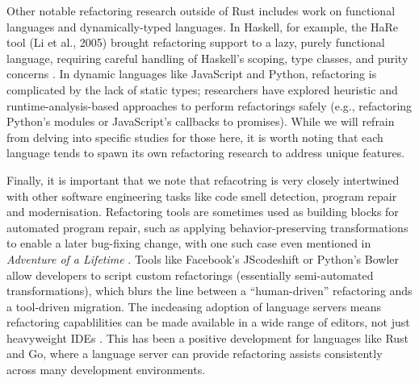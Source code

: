 Other notable refactoring research outside of Rust includes work on functional
languages and dynamically-typed languages. In Haskell, for example, the HaRe
tool (Li et al., 2005) brought refactoring support to a lazy, purely functional
language, requiring careful handling of Haskell's scoping, type classes, and
purity concerns \cite{HaRe}. In dynamic languages like JavaScript and Python, refactoring is
complicated by the lack of static types; researchers have explored heuristic and
runtime-analysis-based approaches to perform refactorings safely (e.g.,
refactoring Python's modules or JavaScript's callbacks to promises). While we
will refrain from delving into specific studies for those here, it is worth noting that each
language tends to spawn its own refactoring research to address unique features.

Finally, it is important that we note that refacotring is very closely
intertwined with other software engineering tasks like code smell detection,
program repair and modernisation. Refactoring tools are sometimes used as
building blocks for automated program repair, such as applying
behavior-preserving transformations to enable a later bug-fixing change, with
one such case even mentioned in
\textit{Adventure of a Lifetime} \cite{AdventureOfALifetime}. Tools like
Facebook's JScodeshift or Python's Bowler allow developers to script custom
refactorings (essentially semi-automated transformations), which blurs the line
between a ``human-driven'' refactoring ands a tool-driven migration. The
incdeasing adoption of language servers means refactoring capablilities can be
made available in a wide range of editors, not just heavyweight IDEs
\cite{AdventureOfALifetime}. This has been a positive development for languages
like Rust and Go, where a language server can provide refactoring assists
consistently across many development environments.

